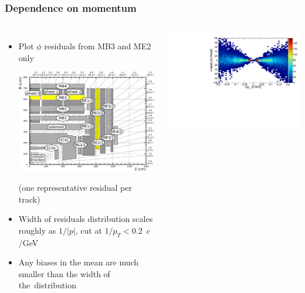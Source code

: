 \documentclass[compress]{beamer}
\begin{document}
\begin{frame}
\frametitle{Dependence on momentum}

\begin{columns}
\begin{itemize}
\item Plot $\phi$ residuals from MB3 and ME2 only

\includegraphics[width=\linewidth]{muon_system_labeled_mb3-me2.pdf}

(one representative residual per track)

\item Width of residuals distribution scales roughly as $1/|p|$, cut at $1/p_T < 0.2$~$c$/GeV

\item Any biases in the mean are much smaller than the width of
  \mbox{the distribution\hspace{-1 cm}}
\end{itemize}

\includegraphics[width=\linewidth]{simple2d_qoverpt.pdf}


\end{columns}
\end{frame}
\end{document}
